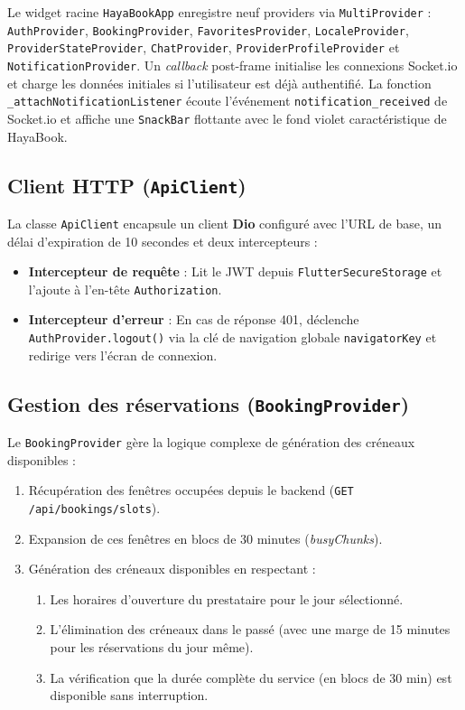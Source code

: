 Le widget racine \texttt{HayaBookApp} enregistre neuf providers via \texttt{MultiProvider} : \texttt{AuthProvider}, \texttt{BookingProvider}, \texttt{FavoritesProvider}, \texttt{LocaleProvider}, \texttt{ProviderStateProvider}, \texttt{ChatProvider}, \texttt{ProviderProfileProvider} et \texttt{NotificationProvider}. Un \textit{callback} post-frame initialise les connexions Socket.io et charge les données initiales si l'utilisateur est déjà authentifié. La fonction \texttt{\_attachNotificationListener} écoute l'événement \texttt{notification\_received} de Socket.io et affiche une \texttt{SnackBar} flottante avec le fond violet caractéristique de HayaBook.

\subsection{Client HTTP (\texttt{ApiClient})}

La classe \texttt{ApiClient} encapsule un client \textbf{Dio} configuré avec l'URL de base, un délai d'expiration de 10 secondes et deux intercepteurs :
\begin{itemize}
    \item \textbf{Intercepteur de requête} : Lit le JWT depuis \texttt{FlutterSecureStorage} et l'ajoute à l'en-tête \texttt{Authorization}.
    \item \textbf{Intercepteur d'erreur} : En cas de réponse 401, déclenche \texttt{AuthProvider.logout()} via la clé de navigation globale \texttt{navigatorKey} et redirige vers l'écran de connexion.
\end{itemize}

\subsection{Gestion des réservations (\texttt{BookingProvider})}

Le \texttt{BookingProvider} gère la logique complexe de génération des créneaux disponibles :

\begin{enumerate}
    \item Récupération des fenêtres occupées depuis le backend (\texttt{GET /api/bookings/slots}).
    \item Expansion de ces fenêtres en blocs de 30 minutes (\textit{busyChunks}).
    \item Génération des créneaux disponibles en respectant :
    \begin{enumerate}
        \item Les horaires d'ouverture du prestataire pour le jour sélectionné.
        \item L'élimination des créneaux dans le passé (avec une marge de 15 minutes pour les réservations du jour même).
        \item La vérification que la durée complète du service (en blocs de 30 min) est disponible sans interruption.
    \end{enumerate}
\end{enumerate}

